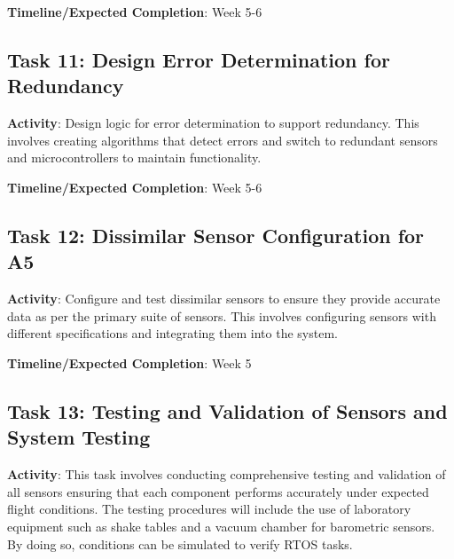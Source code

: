 \textbf{Timeline/Expected Completion}: Week 5-6

\subsection{Task 11: Design Error Determination for Redundancy}
\textbf{Activity}: Design logic for error determination to support redundancy. This involves creating algorithms that detect errors and switch to redundant sensors and microcontrollers to maintain functionality. 

\textbf{Timeline/Expected Completion}: Week 5-6

\subsection{Task 12: Dissimilar Sensor Configuration for A5}
\textbf{Activity}: Configure and test dissimilar sensors to ensure they provide accurate data as per the primary suite of sensors. This involves configuring sensors with different specifications and integrating them into the system.

\textbf{Timeline/Expected Completion}: Week 5

\subsection{Task 13: Testing and Validation of Sensors and System Testing}
\textbf{Activity}: This task involves conducting comprehensive testing and validation of all sensors ensuring that each component performs accurately under expected flight conditions. The testing procedures will include the use of laboratory equipment such as shake tables and a vacuum chamber for barometric sensors. By doing so, conditions can be simulated to verify RTOS tasks. 

